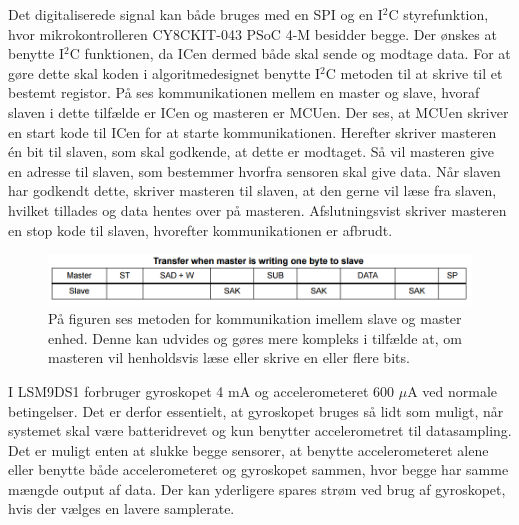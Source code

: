 Det digitaliserede signal kan både bruges med en SPI og en I$^{2}$C styrefunktion, hvor mikrokontrolleren CY8CKIT-043 PSoC 4-M besidder begge. Der ønskes at benytte I$^{2}$C funktionen, da ICen dermed både skal sende og modtage data. For at gøre dette skal koden i algoritmedesignet benytte I$^2$C metoden til at skrive til et bestemt registor. På  ses kommunikationen mellem en master og slave, hvoraf slaven i dette tilfælde er ICen og masteren er MCUen. Der ses, at MCUen skriver en start kode til ICen for at starte kommunikationen. Herefter skriver masteren én bit til slaven, som skal godkende, at dette er modtaget. Så vil masteren give en adresse til slaven, som bestemmer hvorfra sensoren skal give data. Når slaven har godkendt dette, skriver masteren til slaven, at den gerne vil læse fra slaven, hvilket tillades og data hentes over på masteren. Afslutningsvist skriver masteren en stop kode til slaven, hvorefter kommunikationen er afbrudt. %
\begin{figure}[H]
	\centering
	\includegraphics[scale=0.75]{figures/cDesign/Sensor_write_read2.png}
	\caption{På figuren ses metoden for kommunikation imellem slave og master enhed. Denne kan udvides og gøres mere kompleks i tilfælde at, om masteren vil henholdsvis læse eller skrive en eller flere bits.\citep{STMicroelectronics2016}}
	\label{Fig:master_slave}
\end{figure}
I LSM9DS1 forbruger gyroskopet 4 mA og accelerometeret 600 $\mu$A ved normale betingelser. Det er derfor essentielt, at gyroskopet bruges så lidt som muligt, når systemet skal være batteridrevet og kun benytter accelerometret til datasampling. Det er muligt enten at slukke begge sensorer, at benytte accelerometeret alene eller benytte både accelerometeret og gyroskopet sammen, hvor begge har samme mængde output af data. Der kan yderligere spares strøm ved brug af gyroskopet, hvis der vælges en lavere samplerate.\\ %
